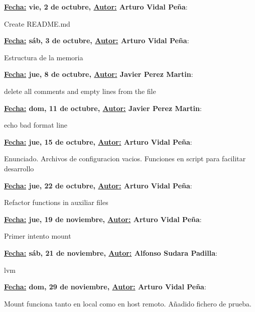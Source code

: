 \item \textbf{\underline{Fecha:} vie,  2 de octubre, \underline{Autor:} Arturo Vidal Peña}:\\\item[] Create README.md\\
\item \textbf{\underline{Fecha:} sáb,  3 de octubre, \underline{Autor:} Arturo Vidal Peña}:\\\item[] Estructura de la memoria\\
\item \textbf{\underline{Fecha:} jue,  8 de octubre, \underline{Autor:} Javier Perez Martin}:\\\item[] delete all comments and empty lines from the file\\
\item \textbf{\underline{Fecha:} dom, 11 de octubre, \underline{Autor:} Javier Perez Martin}:\\\item[] echo bad format line\\
\item \textbf{\underline{Fecha:} jue, 15 de octubre, \underline{Autor:} Arturo Vidal Peña}:\\\item[] Enunciado. Archivos de configuracion vacios. Funciones en script para facilitar desarrollo\\
\item \textbf{\underline{Fecha:} jue, 22 de octubre, \underline{Autor:} Arturo Vidal Peña}:\\\item[] Refactor functions in auxiliar files\\
\item \textbf{\underline{Fecha:} jue, 19 de noviembre, \underline{Autor:} Arturo Vidal Peña}:\\\item[] Primer intento mount\\
\item \textbf{\underline{Fecha:} sáb, 21 de noviembre, \underline{Autor:} Alfonso Sudara Padilla}:\\\item[] lvm\\
\item \textbf{\underline{Fecha:} dom, 29 de noviembre, \underline{Autor:} Arturo Vidal Peña}:\\\item[] Mount funciona tanto en local como en host remoto. Añadido fichero de prueba.\\
